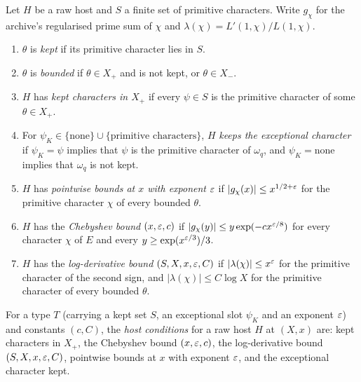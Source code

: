 \begin{definition}\label{host:kept}
Let $H$ be a raw host and $S$ a finite set of primitive characters. Write
$g_{\chi}$ for the archive's regularised prime sum of $\chi$ and
$\lambda(\chi)=L'(1,\chi)/L(1,\chi)$.
\begin{enumerate}
\item $\theta$ is \emph{kept} if its primitive character lies in $S$.
\item $\theta$ is \emph{bounded} if $\theta\in X_+$ and is not kept, or
  $\theta\in X_-$.
\item $H$ has \emph{kept characters in $X_+$} if every $\psi\in S$ is the
  primitive character of some $\theta\in X_+$.
\item For $\psi_K\in\{\text{none}\}\cup\{\text{primitive characters}\}$, $H$
  \emph{keeps the exceptional character} if $\psi_K=\psi$ implies that
  $\psi$ is the primitive character of $\omega_q$, and $\psi_K=\text{none}$
  implies that $\omega_q$ is not kept.
\item $H$ has \emph{pointwise bounds at $x$ with exponent $\varepsilon$} if
  $|g_{\chi}(x)|\le x^{1/2+\varepsilon}$ for the primitive character $\chi$ of every
  bounded $\theta$.
\item $H$ has the \emph{Chebyshev bound} $(x,\varepsilon,c)$ if
  $|g_{\chi}(y)|\le y\exp(-cx^{\varepsilon/8})$ for every character $\chi$ of $E$
  and every $y\ge\exp(x^{\varepsilon/3})/3$.
\item $H$ has the \emph{log-derivative bound} $(S,X,x,\varepsilon,C)$ if
  $|\lambda(\chi)|\le x^{\varepsilon}$ for the primitive character of the second
  sign, and $|\lambda(\chi)|\le C\log X$ for the primitive character of
  every bounded $\theta$.
\end{enumerate}
\end{definition}

\begin{definition}\label{host:host-conditions}
For a type $T$ (carrying a kept set $S$, an exceptional slot $\psi_K$ and an
exponent $\varepsilon$) and constants $(c,C)$, the \emph{host conditions} for a raw
host $H$ at $(X,x)$ are: kept characters in $X_+$, the Chebyshev bound
$(x,\varepsilon,c)$, the log-derivative bound $(S,X,x,\varepsilon,C)$, pointwise bounds at
$x$ with exponent $\varepsilon$, and the exceptional character kept.
\end{definition}

